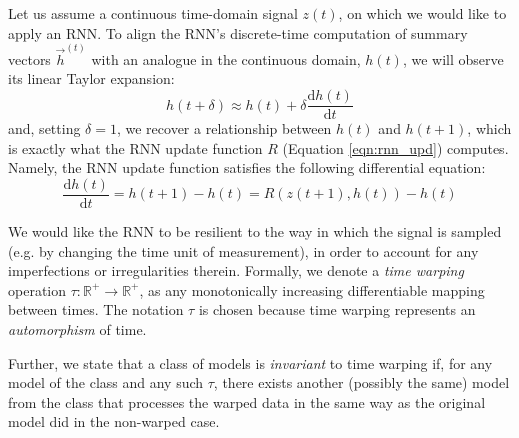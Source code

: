 Let us assume a continuous time-domain signal $z(t)$, on which we would like to apply an RNN. To align the RNN's discrete-time computation of summary vectors $\vec{h}^{(t)}$ with an analogue in the continuous domain, $h(t)$, we will observe its linear Taylor expansion:
\begin{equation}
    h(t + \delta) \approx h(t) + \delta\frac{\mathrm{d}h(t)}{\mathrm{d}t}
\end{equation}
and, setting $\delta = 1$, we recover a relationship between $h(t)$ and $h(t+1)$, which is exactly what the RNN update function $R$ (Equation \ref{eqn:rnn_upd}) computes. Namely, the RNN update function satisfies the following differential equation:
\begin{equation}\label{eqn:ode_pre_warp}
    \frac{\mathrm{d}h(t)}{\mathrm{d}t} = h(t+1) - h(t) = R(z(t+1), h(t)) - h(t)
\end{equation}

We would like the RNN to be resilient to the way in which the signal is sampled (e.g. by changing the time unit of measurement), in order to account for any imperfections or irregularities therein. Formally, we denote a \emph{time warping} operation $\tau : \mathbb{R}^+\rightarrow\mathbb{R}^+$, as any monotonically increasing differentiable mapping between times. The notation $\tau$ is chosen because time warping represents an \emph{automorphism} of time.

Further, we state that a class of models is \emph{invariant} to time warping if, for any model of the class and any such $\tau$, there exists another (possibly the same) model from the class that processes the warped data in the same way as the original model did in the non-warped case.

